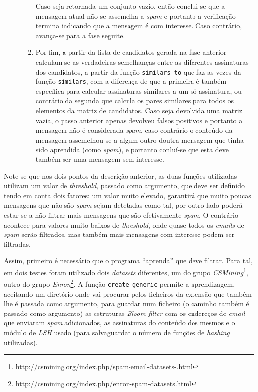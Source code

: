 \documentclass[a4paper,11pt,openright,oneside]{report}
\begin{document}
\begin{description}
\begin{enumerate}
    Caso seja retornada um conjunto vazio, então conclui-se que a mensagem atual não se assemelha a \textit{spam} e portanto a verificação termina indicando que a mensagem é com interesse. Caso contrário, avança-se para a fase seguite.
  \item Por fim, a partir da lista de candidatos gerada na fase anterior calculam-se as verdadeiras semelhanças entre as diferentes assinaturas dos candidatos, a partir da função \texttt{similars\_to} que faz as vezes da função \texttt{similars}, com a diferença de que a primeira é também específica para calcular assinaturas similares a um só assinatura, ou contrário da segunda que calcula os pares similares para todos os elementos da matriz de candidatos. Caso seja devolvida uma matriz vazia, o passo anterior apenas devolveu falsos positivos e portanto a mensagem não é considerada \textit{spam}, caso contrário o conteúdo da mensagem assemelhou-se a algum outro doutra mensagem que tinha sido aprendida (como \textit{spam}), e portanto conluí-se que esta deve também ser uma mensagem sem interesse.
  \end{enumerate}
\end{description}

Note-se que nos dois pontos da descrição anterior, as duas funções utilizadas utilizam um valor de \textit{threshold}, passado como argumento, que deve ser definido tendo em conta dois fatores: um valor muito elevado, garantirá que muito poucas mensagens que não são \textit{spam} sejam detetadas como tal, por outro lado poderá estar-se a não filtrar mais mensagens que são efetivamente \textit{spam}. O contrário acontece para valores muito baixos de \textit{threshold}, onde quase todos os \textit{emails} de \textit{spam} serão filtrados, mas também mais mensagens com interesse podem ser filtradas.

Assim, primeiro é necessário que o programa ``aprenda'' que  deve filtrar. Para tal, em dois testes foram utilizado dois \textit{datasets} diferentes, um do grupo \textit{CSMining}\footnote{\url{http://csmining.org/index.php/spam-email-datasets-.html}}, outro do grupo \textit{Enron}\footnote{\url{http://csmining.org/index.php/enron-spam-datasets.html}}. A função \texttt{create\_generic} permite a aprendizagem, aceitando um diretório onde vai procurar pelos ficheiros da extensão que também lhe é passada como argumento, para guardar num ficheiro (o caminho também é passado como argumento) as estruturas \textit{Bloom-filter} com os endereços de \textit{email} que enviaram \textit{spam} adicionados, as assinaturas do conteúdo dos mesmos e o módulo de \textit{LSH} usado (para salvaguardar o número de funções de \textit{hashing} utilizadas).
\end{document}

